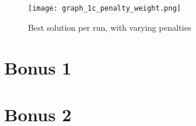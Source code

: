 \documentclass[11pt]{article}
\begin{document}
\begin{figure}
\caption{Best solution per run, with varying penalties}
\centering
\texttt{[image: graph\_1c\_penalty\_weight.png]}\\
\end{figure}


\section{Bonus 1}


\section{Bonus 2}
\end{document}
